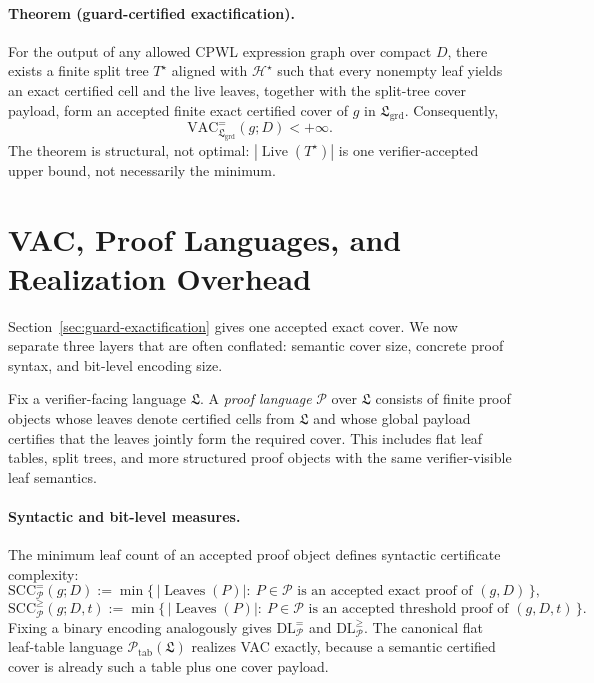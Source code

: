 \documentclass{article}
\begin{document}
\paragraph{Theorem (guard-certified exactification).}
For the output of any allowed CPWL expression graph over compact $D$, there exists a finite split tree $T^\star$ aligned with $\mathcal H^\star$ such that every nonempty leaf yields an exact certified cell and the live leaves, together with the split-tree cover payload, form an accepted finite exact certified cover of $g$ in $\mathfrak L_{\mathrm{grd}}$. Consequently,
\[
\mathrm{VAC}^{=}_{\mathfrak L_{\mathrm{grd}}}(g;D)<+\infty.
\]
The theorem is structural, not optimal: $|\operatorname{Live}(T^\star)|$ is one verifier-accepted upper bound, not necessarily the minimum.

\section{VAC, Proof Languages, and Realization Overhead}\label{sec:vac-proof-languages}

Section~\ref{sec:guard-exactification} gives one accepted exact cover. We now separate three layers that are often conflated: semantic cover size, concrete proof syntax, and bit-level encoding size.

Fix a verifier-facing language $\mathfrak L$. A \emph{proof language} $\mathcal P$ over $\mathfrak L$ consists of finite proof objects whose leaves denote certified cells from $\mathfrak L$ and whose global payload certifies that the leaves jointly form the required cover. This includes flat leaf tables, split trees, and more structured proof objects with the same verifier-visible leaf semantics.

\paragraph{Syntactic and bit-level measures.}
The minimum leaf count of an accepted proof object defines syntactic certificate complexity:
\[
\mathrm{SCC}^{=}_{\mathcal P}(g;D)
:=
\min\{\,|\operatorname{Leaves}(P)|:\ P\in\mathcal P\text{ is an accepted exact proof of }(g,D)\,\},
\]
\[
\mathrm{SCC}^{\ge}_{\mathcal P}(g;D,t)
:=
\min\{\,|\operatorname{Leaves}(P)|:\ P\in\mathcal P\text{ is an accepted threshold proof of }(g,D,t)\,\}.
\]
Fixing a binary encoding analogously gives $\mathrm{DL}^{=}_{\mathcal P}$ and $\mathrm{DL}^{\ge}_{\mathcal P}$. The canonical flat leaf-table language $\mathcal P_{\mathrm{tab}}(\mathfrak L)$ realizes VAC exactly, because a semantic certified cover is already such a table plus one cover payload.
\end{document}
